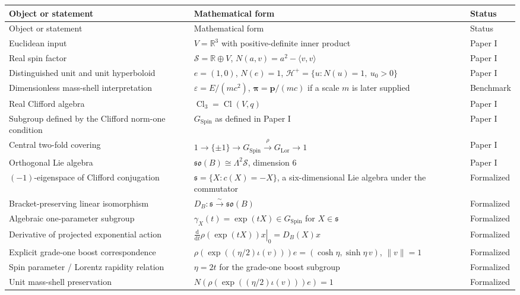 \documentclass[11pt,a4paper]{article}
\theoremstyle{remark}
\newcommand{\R}{\mathbb{R}}
\newcommand{\Cl}{\operatorname{Cl}}
\newcommand{\SpinG}{G_{\mathrm{Spin}}}
\newcommand{\LorG}{G_{\mathrm{Lor}}}
\newcommand{\Smodel}{\mathcal S}
\newcommand{\soB}{\mathfrak{so}(B)}
\newcommand{\dd}{\mathrm d}
\newcommand{\statusPaper}{\textsf{Paper I}}
\newcommand{\statusFormal}{\textsf{Formalized}}
\newcommand{\statusBenchmark}{\textsf{Benchmark}}
\begin{document}
\small
\begin{longtable}{@{}L{0.26\textwidth}L{0.47\textwidth}L{0.13\textwidth}@{}}
\toprule
Object or statement & Mathematical form & Status \\
\midrule
\endfirsthead
\toprule
Object or statement & Mathematical form & Status \\
\midrule
\endhead
Euclidean input & \(V=\R^3\) with positive-definite inner product & \statusPaper \\
Real spin factor & \(\Smodel=\R\oplus V\), \(N(a,v)=a^2-\langle v,v\rangle\) & \statusPaper \\
Distinguished unit and unit hyperboloid & \(e=(1,0)\), \(N(e)=1\), \(\mathcal H^+=\{u:N(u)=1,\ u_0>0\}\) & \statusPaper \\
Dimensionless mass-shell interpretation & \(\varepsilon=E/(mc^2)\), \(\boldsymbol\pi=\mathbf p/(mc)\) if a scale \(m\) is later supplied & \statusBenchmark \\
Real Clifford algebra & \(\Cl_3=\Cl(V,q)\) & \statusPaper \\
Subgroup defined by the Clifford norm-one condition & \(\SpinG\) as defined in Paper I & \statusPaper \\
Central two-fold covering & \(1\to\{\pm1\}\to\SpinG\overset{\rho}{\to}\LorG\to1\) & \statusPaper \\
Orthogonal Lie algebra & \(\soB\cong\Lambda^2\Smodel\), dimension \(6\) & \statusPaper \\
\((-1)\)-eigenspace of Clifford conjugation & \(\mathfrak s=\{X:c(X)=-X\}\), a six-dimensional Lie algebra under the commutator & \statusFormal \\
Bracket-preserving linear isomorphism & \(D_B:\mathfrak s\xrightarrow{\sim}\soB\) & \statusFormal \\
Algebraic one-parameter subgroup & \(\gamma_X(t)=\exp(tX)\in\SpinG\) for \(X\in\mathfrak s\) & \statusFormal \\
Derivative of projected exponential action & \(\left.\frac{\dd}{\dd t}\rho(\exp(tX))x\right|_{0}=D_B(X)x\) & \statusFormal \\
Explicit grade-one boost correspondence & \(\rho(\exp((\eta/2)\iota(v)))e=(\cosh\eta,\sinh\eta\,v)\), \(\|v\|=1\) & \statusFormal \\
Spin parameter / Lorentz rapidity relation & \(\eta=2t\) for the grade-one boost subgroup & \statusFormal \\
Unit mass-shell preservation & \(N(\rho(\exp((\eta/2)\iota(v)))e)=1\) & \statusFormal \\

\end{longtable}
\end{document}
